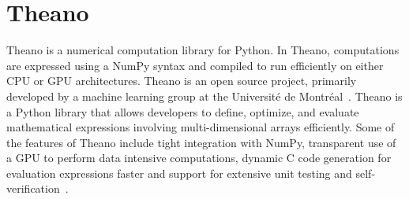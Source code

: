\section{Theano}

Theano is a numerical computation library for Python. In Theano, computations are expressed using a NumPy syntax and compiled to run efficiently on either CPU or GPU architectures. Theano is an open source project, primarily developed by a machine learning group at the Université de Montréal~\cite{hid-sp18-510-wiki-theano}. Theano is a Python library that allows developers to define, optimize, and evaluate mathematical expressions involving multi-dimensional arrays efficiently. Some of the features of Theano include tight integration with NumPy, transparent use of a GPU to perform data intensive computations, dynamic C code generation for evaluation expressions faster and support for extensive unit testing and self-verification~\cite{hid-sp18-510-web-theano}.
